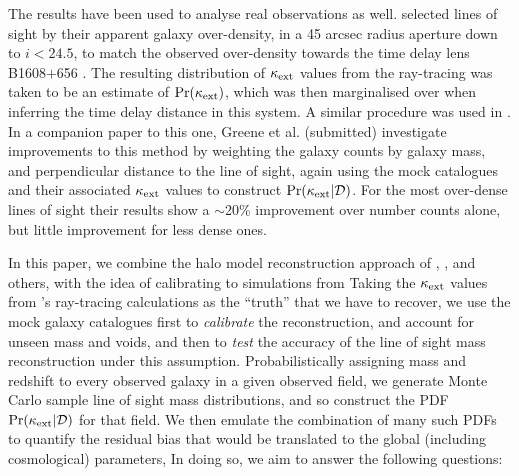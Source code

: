 \documentclass[useAMS,usenatbib,a4paper]{mn2e}
\begin{document}
The \MS results have been used to analyse real observations as well. 
\citet{SuyuEtal2010} selected \MS lines of sight by their apparent
galaxy over-density, in a 45 arcsec radius aperture down to $i < 24.5$,
to match the observed over-density towards the time delay lens
B1608$+$656 \citep{FassnachtEtal2011}.  The resulting distribution of
$\kappa_{\rm ext}$ values from the ray-tracing was taken to be an estimate of 
$\Pr(\kappa_{\rm ext})$, which was then marginalised over when inferring the time
delay distance in this system. A similar procedure was used in \citet{SuyuEtal2012}.
In a companion paper to this one, Greene et al. (submitted) investigate
improvements to this method by weighting the galaxy counts by galaxy
mass, and perpendicular distance to the line of sight, again using the
\MS mock catalogues and their associated $\kappa_{\rm ext}$ values to construct
$\Pr(\kappa_{\rm ext}|{\mathcal{D}})$. For the most over-dense lines of sight their
results  show a $\sim$20\% improvement over
number counts alone, but little improvement for less dense ones.


In this paper, we combine the halo model reconstruction approach of
\citeauthor{GunnarssonEtal2006}, \citeauthor{JonssonEtal2010}, 
\citeauthor{WongEtal2011} and others, with the
idea of calibrating to simulations from \citeauthor{SuyuEtal2010}
Taking the $\kappa_{\rm ext}$ values from
\citeauthor{HilbertEtal2009}'s ray-tracing calculations as the ``truth''
that we have to recover, we use the \MS mock galaxy catalogues first to
{\it calibrate} the reconstruction, and account for unseen mass and
voids, and then to {\it test} the accuracy of the line of sight mass
reconstruction under this assumption. Probabilistically assigning mass
and redshift to every observed galaxy in a given observed field, we
generate Monte Carlo sample line of sight mass distributions, and so
construct the PDF $\Pr(\kappa_{\rm ext}|{\mathcal{D}})$ for that field. We then emulate
the combination of many such PDFs to quantify the residual bias that
would be translated to the global (including cosmological) parameters, 
In doing so, we aim to answer the following questions: 
\end{document}
